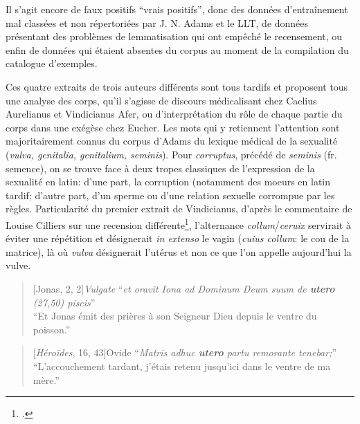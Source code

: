 Il s'agit encore de faux positifs \enquote{vrais positifs}, donc des données d'entraînement mal classées et non répertoriées par J. N. Adams et le LLT, de données présentant des problèmes de lemmatisation qui ont empêché le recensement, ou enfin de données qui étaient absentes du corpus au moment de la compilation du catalogue d'exemples.

Ces quatre extraits de trois auteurs différents sont tous tardifs et proposent tous une analyse des corps, qu'il s'agisse de discours médicalisant chez Caelius Aurelianus et Vindicianus Afer, ou d'interprétation du rôle de chaque partie du corps dans une exégèse chez Eucher. Les mots qui y retiennent l'attention sont majoritairement connus du corpus d'Adams du lexique médical de la sexualité (\textit{vulva, genitalia, genitalium, seminis}). Pour \textit{corruptus}, précédé de \textit{seminis} (fr. semence), on se trouve face à deux tropes classiques de l'expression de la sexualité en latin: d'une part, la corruption (notamment des moeurs en latin tardif; d'autre part, d'un sperme ou d'une relation sexuelle corrompue par les règles. Particularité du premier extrait de Vindicianus, d'après le commentaire de Louise Cilliers sur une recension différente\footcite[p.236]{cilliers_vindicianuss_2005}, l'alternance \textit{collum}/\textit{ceruix} servirait à éviter une répétition et désignerait \textit{in extenso} le vagin (\textit{cuius collum}: le cou de la matrice), là où \textit{vulva} désignerait l'utérus et non ce que l'on appelle aujourd'hui la vulve.

\starbreak

\begin{quote}[Jonas, 2, 2]{\textit{Vulgate}}
    \enquote{\textit{et oravit Iona ad Dominum Deum suum de \textbf{utero} (27,50) piscis}} \\
    \enquote{Et Jonas émit des prières à son Seigneur Dieu depuis le ventre du poisson.}
\end{quote}

\begin{quote}[\textit{Héroïdes}, 16, 43]{Ovide}
    \enquote{\textit{Matris adhuc \textbf{utero} partu remorante tenebar;}} \\
    \enquote{L'accouchement tardant, j'étais retenu jusqu'ici dans le ventre de ma mère.}
\end{quote} 

\starbreak

